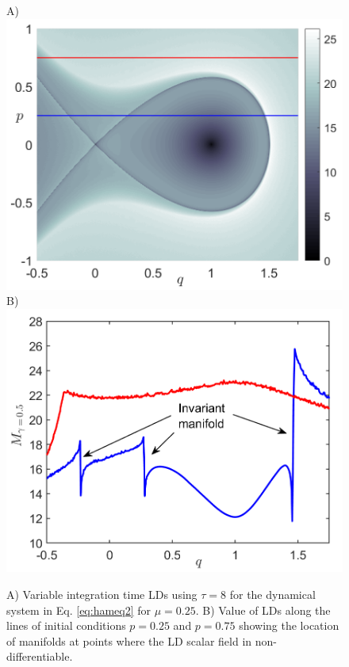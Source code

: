 \documentclass[8pt]{article}
\begin{document}
\begin{figure}[htbp]
	\begin{center}
		A)\includegraphics[scale=0.26]{fig3a.png}
		B)\includegraphics[scale=0.25]{fig3b.png}
	\end{center}
	\caption{A) Variable integration time LDs using $\tau = 8$ for the dynamical system in Eq. \eqref{eq:hameq2} for $\mu = 0.25$. B) Value of LDs along the lines of initial conditions $p = 0.25$ and $p = 0.75$ showing the location of manifolds at points where the LD scalar field in non-differentiable.}
	\label{fig:ld_bif_sn_transf}
\end{figure}
\end{document}
